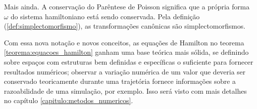 Mais ainda. A conservação do Parêntese de Poisson significa que a própria forma $\omega$ do sistema hamiltoniano está sendo conservada. Pela definição (\ref{def:simplectomorfismo}), as transformações canônicas são simplectomorfismos.

Com essa nova notação e novos conceitos, as equações de Hamilton no teorema \ref{teorema:equacoes_hamilton} ganham uma base teórica mais sólida, se definindo sobre espaços com estruturas bem definidas e específicas o suficiente para fornecer resultados numéricos; observar a variação numérica de um valor que deveria ser conservado teoricamente durante uma trajetória fornece informações sobre a razoabilidade de uma simulação, por exemplo. Isso será visto com mais detalhes no capítulo \ref{capitulo:metodos_numericos}.
